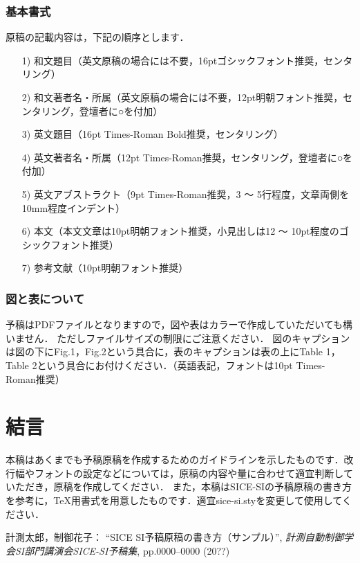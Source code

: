 \documentclass[a4paper]{jarticle}
\begin{document}
\subsubsection{基本書式}
原稿の記載内容は，下記の順序とします．
\begin{enumerate}
\setlength{\parskip}{0cm} %
\setlength{\itemsep}{0cm} %
\item[1)] 和文題目（英文原稿の場合には不要，16ptゴシックフォント推奨，センタリング）
\item[2)] 和文著者名・所属（英文原稿の場合には不要，12pt明朝フォント推奨，センタリング，登壇者に○を付加）
\item[3)] 英文題目（16pt Times-Roman Bold推奨，センタリング）
\item[4)] 英文著者名・所属（12pt Times-Roman推奨，センタリング，登壇者に○を付加）
\item[5)] 英文アブストラクト（9pt Times-Roman推奨，3 〜 5行程度，文章両側を10mm程度インデント）
\item[6)] 本文（本文文章は10pt明朝フォント推奨，小見出しは12 〜 10pt程度のゴシックフォント推奨）
\item[7)] 参考文献（10pt明朝フォント推奨）
\end{enumerate}
\subsubsection{図と表について}
予稿はPDFファイルとなりますので，図や表はカラーで作成していただいても構いません．
ただしファイルサイズの制限にご注意ください．
図のキャプションは図の下にFig.1，Fig.2という具合に，表のキャプションは表の上にTable 1，Table 2という具合にお付けください．（英語表記，フォントは10pt Times-Roman推奨）
%
\section{結言}
本稿はあくまでも予稿原稿を作成するためのガイドラインを示したものです．改行幅やフォントの設定などについては，原稿の内容や量に合わせて適宜判断していただき，原稿を作成してください．
また，本稿はSICE-SIの予稿原稿の書き方\cite{SI}を参考に，\TeX 用書式を用意したものです．適宜sice-si.styを変更して使用してください．
%
%
\begin{thebibliography}{99}
	計測太郎，制御花子：
	``SICE SI予稿原稿の書き方（サンプル）'',  
   {\it 計測自動制御学会SI部門講演会SICE-SI予稿集}, 
    pp.0000--0000 (20??)
\end{thebibliography}
%
%
%
\end{document}
